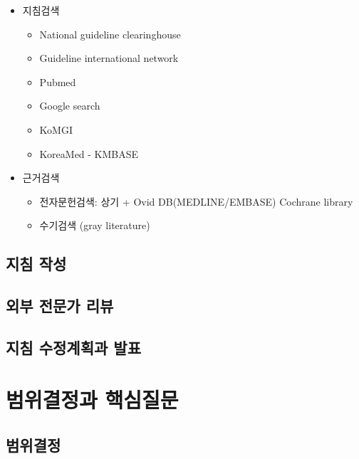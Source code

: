 \documentclass[]{book}
\providecommand{\tightlist}{%
  \setlength{\itemsep}{0pt}\setlength{\parskip}{0pt}}
\begin{document}
\begin{itemize}
\item
  지침검색

  \begin{itemize}
  \tightlist
  \item
    National guideline clearinghouse
  \item
    Guideline international network
  \item
    Pubmed
  \item
    Google search
  \item
    KoMGI
  \item
    KoreaMed - KMBASE
  \end{itemize}
\item
  근거검색

  \begin{itemize}
  \tightlist
  \item
    전자문헌검색: 상기 + Ovid DB(MEDLINE/EMBASE) Cochrane library
  \item
    수기검색 (gray literature)
  \end{itemize}
\end{itemize}

\hypertarget{section-43}{%
\section*{지침 작성}\label{section-43}}

\hypertarget{section-44}{%
\section*{외부 전문가 리뷰}\label{section-44}}

\hypertarget{section-45}{%
\section*{지침 수정계획과 발표}\label{section-45}}

\hypertarget{section-46}{%
\chapter{범위결정과 핵심질문}\label{section-46}}

\hypertarget{section-47}{%
\section*{범위결정}\label{section-47}}
\end{document}
